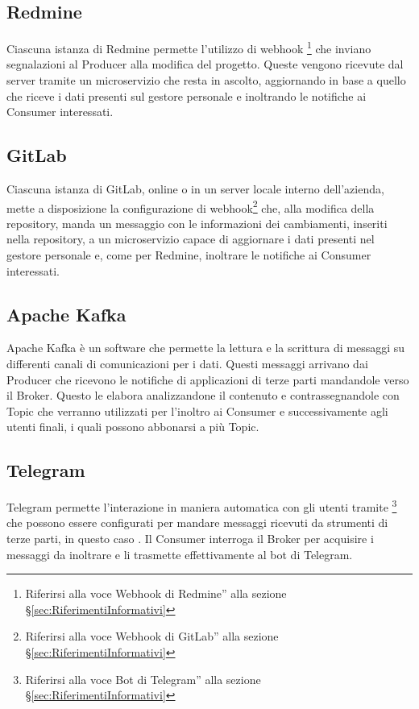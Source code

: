 		\subsection{Redmine}
		Ciascuna istanza di Redmine permette l'utilizzo di webhook
        \footnote{Riferirsi alla voce Webhook di Redmine'' alla sezione \S\ref{sec:RiferimentiInformativi}}
        che inviano segnalazioni al Producer alla modifica del progetto.
		Queste vengono ricevute dal server tramite un microservizio che resta
        in ascolto, aggiornando in base a quello che riceve i dati presenti sul gestore
        personale e inoltrando le notifiche ai Consumer interessati.
		
		\subsection{GitLab}
		Ciascuna istanza di GitLab, online o in un server locale interno dell'azienda,
        mette a disposizione la configurazione di webhook\footnote{Riferirsi alla voce Webhook di GitLab'' alla sezione \S\ref{sec:RiferimentiInformativi}}
        che, alla modifica della repository, manda un messaggio con le informazioni dei cambiamenti, inseriti nella repository, a un microservizio capace di
        aggiornare i dati presenti nel gestore personale e, come per Redmine, inoltrare le notifiche ai Consumer interessati.
		
		\subsection{Apache Kafka}
		Apache Kafka è un software  che permette la lettura e la scrittura di messaggi su differenti canali di comunicazioni per i dati.
		Questi messaggi arrivano dai Producer che ricevono le notifiche di applicazioni di terze parti mandandole verso il Broker. Questo le elabora analizzandone
        il contenuto e contrassegnandole con Topic che verranno utilizzati per l'inoltro ai Consumer e successivamente agli utenti finali, i quali possono abbonarsi a più Topic.
		
		\subsection{Telegram}
		Telegram permette l'interazione in maniera automatica con gli utenti tramite
        \footnote{Riferirsi alla voce Bot di Telegram'' alla sezione \S\ref{sec:RiferimentiInformativi}}
        che possono essere configurati per mandare messaggi ricevuti da strumenti di terze parti, in questo caso \progetto.
		Il Consumer interroga il Broker per acquisire i messaggi da inoltrare e li trasmette effettivamente al bot di Telegram.
		
